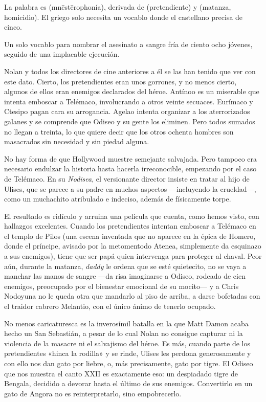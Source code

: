 \label{cap:arco}


La palabra es  (mnēstērophonía), derivada de  (pretendiente) y  (matanza, homicidio). El griego solo necesita un vocablo donde el castellano precisa de cinco.

Un solo vocablo para nombrar el asesinato a sangre fría de ciento ocho jóvenes, seguido de una implacable ejecución.

Nolan y todos los directores de cine anteriores a él se las han tenido que ver con este dato. Cierto, los pretendientes eran unos gorrones, y no menos cierto, algunos de ellos eran enemigos declarados del héroe. Antínoo es un miserable que intenta emboscar a Telémaco, involucrando a otros veinte secuaces. Eurímaco y Ctesipo pagan cara su arrogancia. Agelao intenta organizar a los aterrorizados galanes y se comprende que Odiseo y su gente los eliminen. Pero todos sumados no llegan a treinta, lo que quiere decir que los otros ochenta hombres son masacrados sin necesidad y sin piedad alguna.

No hay forma de que Hollywood muestre semejante salvajada. Pero tampoco era necesario endulzar la historia hasta hacerla irreconocible, empezando por el caso de Telémaco. En su \emph{Nodisea}, el versionante director insiste en tratar al hijo de Ulises, que se parece a su padre en muchos aspectos ---incluyendo la crueldad---, como un muchachito atribulado e indeciso, además de físicamente torpe.

El resultado es ridículo y arruina una película que cuenta, como hemos visto, con hallazgos excelentes. Cuando los pretendientes intentan emboscar a Telémaco en el templo de Pilos (una escena inventada que no aparece en la épica de Homero, donde el príncipe, avisado por la metomentodo Atenea, simplemente da esquinazo a sus enemigos), tiene que ser papá quien intervenga para proteger al chaval. Peor aún, durante la matanza, \emph{daddy} le ordena que se esté quietecito, no se vaya a manchar las manos de sangre ---da risa imaginarse a Odiseo, rodeado de cien enemigos, preocupado por el bienestar emocional de su mocito--- y a Chris Nodoyuna no le queda otra que mandarlo al piso de arriba, a darse bofetadas con el traidor cabrero Melantio, con el único ánimo de tenerlo ocupado.

No menos caricaturesca es la inverosímil batalla en la que Matt Damon acaba hecho un San Sebastián, a pesar de lo cual Nolan no consigue capturar ni la violencia de la masacre ni el salvajismo del héroe. Es más, cuando parte de los pretendientes «hinca la rodilla» y se rinde, Ulises les perdona generosamente y con ello nos dan gato por liebre, o, más precisamente, gato por tigre. El Odiseo que nos muestra el canto XXII es exactamente eso: un despiadado tigre de Bengala, decidido a devorar hasta el último de sus enemigos. Convertirlo en un gato de Angora no es reinterpretarlo, sino empobrecerlo.


